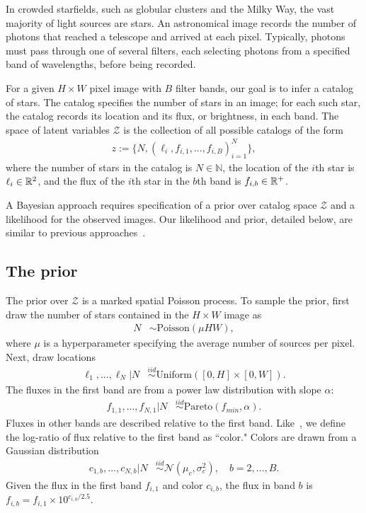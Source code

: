 In crowded starfields, such as globular clusters and the Milky Way, the vast majority of light sources are stars.
An astronomical image records the number of photons that reached a telescope and arrived at each pixel. 
Typically, photons must pass through one of several filters, each selecting photons from a specified band of wavelengths, before being recorded.

For a given $H \times W$ pixel image with $B$ filter bands, our goal is to infer a catalog of 
stars. 
The catalog specifies the number of stars 
in an image; for each such star, the catalog 
records its location and its flux, or brightness,
in each band. 
The space of latent variables 
$\mathcal{Z}$ is the collection of all possible catalogs of the form
\begin{align}
    z := \{N, (\ell_i, f_{i,1}, ..., f_{i,B})_{i = 1}^N\},
    \label{eq:cat_formulation}
\end{align}
where the number of stars in the catalog
is $N\in\mathbb{N}$,
the location of the $i$th star is $\ell_i \in \mathbb{R}^2$, and 
the flux of the $i$th star in the $b$th band is $f_{i, b}\in\mathbb{R}^+$. 

A Bayesian approach requires specification of a prior over catalog space $\mathcal{Z}$ and a likelihood for the observed images. Our likelihood and prior, detailed below, are similar to previous approaches~\citep{Brewer_2013, Portillo_2017, regier2019_celeste, Feder_2019}.

\subsection{The prior}
The prior over $\mathcal{Z}$ is a marked spatial Poisson process. To sample the prior, first draw the number of stars contained in the $H\times W$ image as
\begin{align}
	N &\sim \text{Poisson}(\mu HW),
	\label{eq:n_prior}
\end{align}
where $\mu$ is a hyperparameter specifying the average number of sources per pixel.
Next, draw locations
\begin{align}
  \ell_1, ..., \ell_N | N &\stackrel{iid}{\sim} \text{Uniform}([0, H] \times [0, W]). 
 \end{align}
The fluxes in the first band are from a power law distribution with slope $\alpha$:
\begin{align}
    f_{1, 1}, ..., f_{N,1} | N & 
    \stackrel{iid}{\sim} \text{Pareto}(f_{min}, \alpha) 
    \label{eq:flux_prior}.
\end{align}
Fluxes in other bands are described relative to the first band. Like~\cite{Feder_2019}, we define the log-ratio of flux relative to the first band as ``color." Colors are drawn from a Gaussian distribution
\begin{align}
  c_{1, b}, ..., c_{N,b} | N  & 
      \stackrel{iid}{\sim} \mathcal{N}(\mu_c, \sigma^2_c), \quad b = 2, ..., B.
\end{align}
Given the flux in the first band $f_{i,1}$ and color $c_{i,b}$,
the flux in band $b$ is  $f_{i,b} = f_{i,1} \times 10^{c_{i,b} / 2.5}$.

